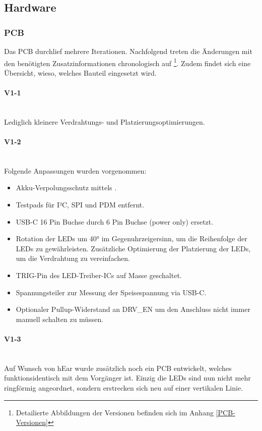 \documentclass[12pt]{article}
\begin{document}
	\subsection{Hardware}
	\subsubsection{PCB}
	Das PCB durchlief mehrere Iterationen. Nachfolgend treten die Änderungen mit den benötigten Zusatzinformationen chronologisch auf \footnote{Detailierte Abbildungen der Versionen befinden sich im Anhang \ref{PCB-Versionen}}. Zudem findet sich eine Übersicht, wieso, welches Bauteil eingesetzt wird.
	\paragraph{V1-1}\mbox{}\\
	Lediglich kleinere Verdrahtungs- und Platzierungsoptimierungen.
	\paragraph{V1-2}\mbox{}\\
	Folgende Anpassungen wurden vorgenommen:
	\begin{itemize}
		\item Akku-Verpolungsschutz mittels .
		\item Testpads für I²C, SPI und PDM entfernt.
		\item USB-C 16 Pin Buchse durch 6 Pin Buchse (power only) ersetzt.
		\item Rotation der LEDs um 40° im Gegenuhrzeigersinn, um die Reihenfolge der LEDs zu gewährleisten. Zusätzliche Optimierung der Platzierung der LEDs, um die Verdrahtung zu vereinfachen.
		\item TRIG-Pin des LED-Treiber-ICs auf Masse geschaltet.
		\item Spannungsteiler zur Messung der Speisespannung via USB-C.
		\item Optionaler Pullup-Widerstand an DRV\_EN um den Anschluss nicht immer manuell schalten zu müssen.
	\end{itemize}
	\paragraph{V1-3}\mbox{}\\
	Auf Wunsch von hEar wurde zusätzlich noch ein PCB entwickelt, welches funktionsidentisch mit dem Vorgänger ist. Einzig die LEDs sind nun nicht mehr ringförmig angeordnet, sondern erstrecken sich neu auf einer vertikalen Linie.
\end{document}
